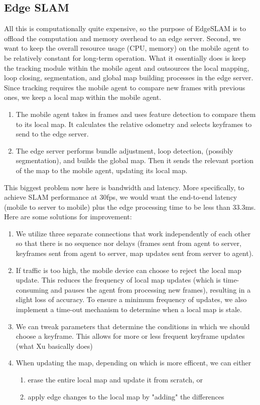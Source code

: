 \documentclass{article}
\begin{document}
  \subsection{Edge SLAM}
  All this is computationally quite expensive, so the purpose of EdgeSLAM is to offload the computation and memory overhead to an edge server. Second, we want to keep the overall resource usage (CPU, memory) on the mobile agent to be relatively constant for long-term operation. What it essentially does is keep the tracking module within the mobile agent and outsources the local mapping, loop closing, segmentation, and global map building processes in the edge server. Since tracking requires the mobile agent to compare new frames with previous ones, we keep a local map within the mobile agent. 
  \begin{enumerate}
      \item The mobile agent takes in frames and uses feature detection to compare them to its local map. It calculates the relative odometry and selects keyframes to send to the edge server. 
      \item The edge server performs bundle adjustment, loop detection, (possibly segmentation), and builds the global map. Then it sends the relevant portion of the map to the mobile agent, updating its local map. 
  \end{enumerate}
  This biggest problem now here is bandwidth and latency. More specifically, to achieve SLAM performance at 30fps, we would want the end-to-end latency (mobile to server to mobile) plus the edge processing time to be less than 33.3ms. Here are some solutions for improvement: 
  \begin{enumerate}
      \item We utilize three separate connections that work independently of each other so that there is no sequence nor delays (frames sent from agent to server, keyframes sent from agent to server, map updates sent from server to agent). 
      
      \item If traffic is too high, the mobile device can choose to reject the local map update. This reduces the frequency of local map updates (which is time-consuming and pauses the agent from processing new frames), resulting in a slight loss of accuracy. To ensure a minimum frequency of updates, we also implement a time-out mechanism to determine when a local map is stale. 
      
      \item We can tweak parameters that determine the conditions in which we should choose a keyframe. This allows for more or less frequent keyframe updates (what Xu basically does)
      
      \item When updating the map, depending on which is more efficent, we can either 
      \begin{enumerate}
          \item erase the entire local map and update it from scratch, or 
          \item apply edge changes to the local map by "adding" the differences
      \end{enumerate}
  \end{enumerate}
\end{document}
